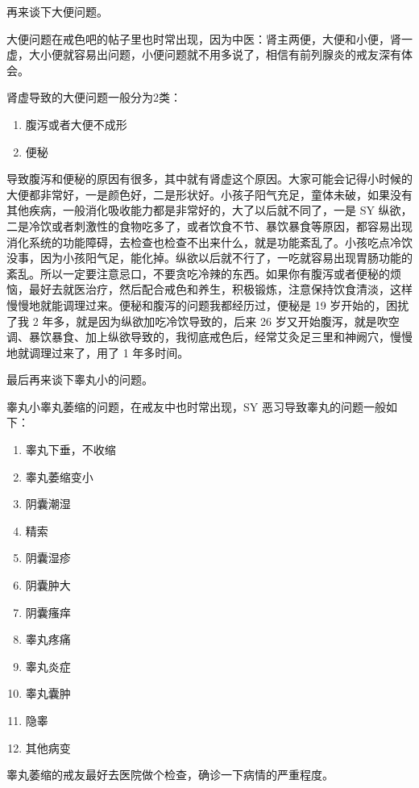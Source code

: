 \documentclass{ctexart}
\begin{document}
再来谈下大便问题。

大便问题在戒色吧的帖子里也时常出现，因为中医：肾主两便，大便和小便，肾一虚，大小便就容易出问题，小便问题就不用多说了，相信有前列腺炎的戒友深有体会。

肾虚导致的大便问题一般分为2类：

\begin{enumerate}
    \item 腹泻或者大便不成形
    \item 便秘
\end{enumerate}

导致腹泻和便秘的原因有很多，其中就有肾虚这个原因。大家可能会记得小时候的大便都非常好，一是颜色好，二是形状好。小孩子阳气充足，童体未破，如果没有其他疾病，一般消化吸收能力都是非常好的，大了以后就不同了，一是 SY 纵欲，二是冷饮或者刺激性的食物吃多了，或者饮食不节、暴饮暴食等原因，都容易出现消化系统的功能障碍，去检查也检查不出来什么，就是功能紊乱了。小孩吃点冷饮没事，因为小孩阳气足，能化掉。纵欲以后就不行了，一吃就容易出现胃肠功能的紊乱。所以一定要注意忌口，不要贪吃冷辣的东西。如果你有腹泻或者便秘的烦恼，最好去就医治疗，然后配合戒色和养生，积极锻炼，注意保持饮食清淡，这样慢慢地就能调理过来。便秘和腹泻的问题我都经历过，便秘是 19 岁开始的，困扰了我 2 年多，就是因为纵欲加吃冷饮导致的，后来 26 岁又开始腹泻，就是吹空调、暴饮暴食、加上纵欲导致的，我彻底戒色后，经常艾灸足三里和神阙穴，慢慢地就调理过来了，用了 1 年多时间。

最后再来谈下睾丸小的问题。

睾丸小睾丸萎缩的问题，在戒友中也时常出现，SY 恶习导致睾丸的问题一般如下：

\begin{enumerate}
    \item 睾丸下垂，不收缩
    \item 睾丸萎缩变小
    \item 阴囊潮湿
    \item 精索
    \item 阴囊湿疹
    \item 阴囊肿大
    \item 阴囊瘙痒
    \item 睾丸疼痛
    \item 睾丸炎症
    \item 睾丸囊肿
    \item 隐睾
    \item 其他病变
\end{enumerate}

睾丸萎缩的戒友最好去医院做个检查，确诊一下病情的严重程度。
\end{document}
